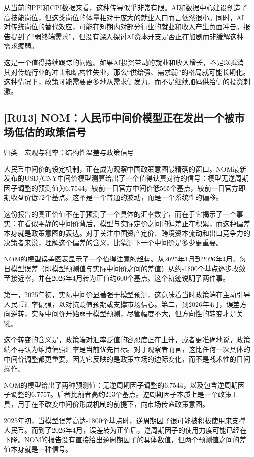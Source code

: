 \documentclass[11pt]{ctexart}
\begin{document}
从当前的PPI和CPI数据来看，这种传导似乎非常有限。AI和数据中心建设创造了高技能岗位，但这类岗位的体量相对于庞大的就业人口而言依然很小。同时，AI对传统岗位的替代效应，可能在短期内对部分行业的就业和收入产生负面冲击。报告提到了“弱终端需求”，但没有深入探讨AI资本开支是否正在加剧而非缓解这种需求疲弱。

这是一个值得持续跟踪的问题。如果AI投资带动的就业和收入增长，不足以抵消其对传统行业的冲击和结构性失业，那么“供给强、需求弱”的格局就可能长期化。这种情况下，政策可能需要更多地从需求侧发力，而不是继续加码供给侧的投资刺激。

\subsection{[R013] NOM：人民币中间价模型正在发出一个被市场低估的政策信号}
{\small\color{refgray}归类：宏观与利率：结构性温差与政策信号}

人民币中间价的设定机制，正在成为观察中国政策意图最精确的窗口。NOM最新发布的USD/CNY中间价模型测算给出了一个值得认真对待的信号：模型无逆周期因子调整的预测值为6.7544，较前一日官方中间价低565个基点，较前一日官方即期收盘价低72个基点。这不是一个普通的波动，而是一个系统性的偏移。

这份报告的真正价值不在于预测了一个具体的汇率数字，而在于它揭示了一个事实：在看似平静的中间价背后，模型与实际定价之间的偏差正在积累，而这种偏差本身就是政策意图的表达。对于关注中国资产定价、跨境资本流动和出口竞争力的决策者来说，理解这个偏差的含义，比猜测下一个中间价是多少更重要。

NOM的模型误差图表显示了一个值得注意的趋势。从2025年1月到2026年4月，每日模型误差（即模型预测值与实际中间价之间的差值）从约-1800个基点逐步收敛至接近零，并在2026年4月转为正值约600个基点。这个轨迹说明了两件事。

第一，2025年初，实际中间价显著强于模型预测，这意味着当时政策端在主动引导人民币汇率偏强，以对抗贬值预期或支撑市场信心。第二，到2026年4月，误差方向逆转，实际中间价开始弱于模型预测，尽管幅度不大，但方向性的转变才是关键。

这个转变的含义是，政策端对汇率贬值的容忍度正在上升，或者更准确地说，政策端不再认为维持偏强汇率是当前优先目标。对于观察者而言，这比任何一次具体的中间价调整都更重要，因为它反映的是政策立场的边际变化，而不是战术性的日间操作。

NOM的模型给出了两种预测值：无逆周期因子调整的6.7544，以及包含逆周期因子调整的6.7757。后者比前者高约213个基点。逆周期因子本质上是一个政策工具，用于在不改变中间价形成机制的前提下，向市场传递政策意图。

2025年初，当模型误差高达-1800个基点时，逆周期因子很可能被积极使用来支撑人民币。而到了2026年4月，误差转为正值后，逆周期因子的使用力度可能已经在下降。NOM的报告没有直接给出逆周期因子的具体数值，但两个预测值之间的差值本身就是一种信号。
\end{document}
